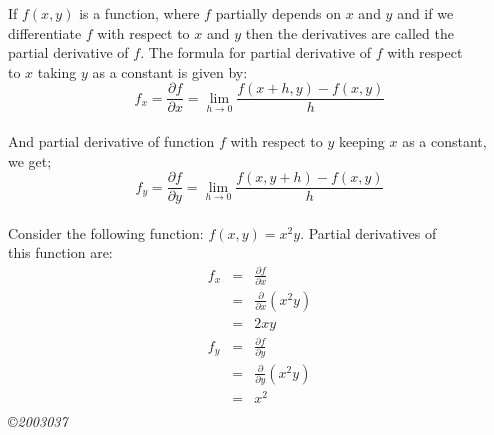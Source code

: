 \documentclass[a4paper, 10pt]{book}
\begin{document}
If $f(x,y)$ is a function, where $f$ partially depends on $x$ and $y$  and if  we \\
differentiate $f$ with respect to $x$ and $y$ then the derivatives are called the \\
partial derivative of $f$. The formula for partial derivative of $f$ with respect \\
to $x$ taking $y$ as a constant is given by:\\
\begin{equation*}
    f_x = \frac{\partial f}{\partial x} = \lim_{h \to 0} \frac{f(x+h,y)-f(x,y)}{h}
\end{equation*}\\

And partial derivative of function $f$ with respect to $y$ keeping $x$ as a constant, \\
we get;\\
\begin{equation*}
    f_y = \frac{\partial f}{\partial y} = \lim_{h \to 0} \frac{f(x,y+h)-f(x,y)}{h}
\end{equation*}\\
Consider the following function: $f(x,y) = x^2y$. Partial derivatives of \\
this function are:\\
\begin{eqnarray*}
    f_x &=& \frac{\partial f}{\partial x}\\
        &=& \frac{\partial}{\partial x} (x^2y)\\
        &=& 2xy\\[5mm]
    f_y &=& \frac{\partial f}{\partial y}\\
        &=& \frac{\partial}{\partial y} (x^2y)\\
        &=& x^2\\
\end{eqnarray*}
\copyright \emph{2003037}
\end{document}
